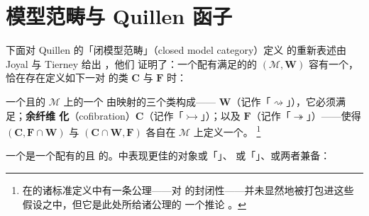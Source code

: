 
\providecommand{\rvC}{\mathbf{C}}  %
\providecommand{\rvW}{\mathbf{W}}  %
\providecommand{\rvF}{\mathbf{F}}  %
\providecommand{\rvWarrow}{\rightsquigarrow}%
\providecommand{\rvFarrow}{\twoheadrightarrow}%
\providecommand{\rvTFarrow}{\rightsquigarrow\joinrel\twoheadrightarrow}%
\providecommand{\rvCarrow}{\rightarrowtail}%
\providecommand{\rvTCarrow}{\rightarrowtail\joinrel\rightsquigarrow}%

\section{模型范畴与 Quillen 函子}\label{sec:model-categories-and-quillen-functors}

下面对 Quillen 的「闭模型范畴」（closed model category）定义%
\cite[I.5.1.1]{bib93} 的重新表述由 Joyal 与 Tierney 给出 \cite[7.7]{bib64}，他们%
证明了：一个配有满足\trTwoOfThreeProperty{}的\trWeakEquivalence{}的\trCategory{}
$(\mathcal{M},\rvW)$ 容有一个\trModelStructure，恰在存在定义如下一对%
\trWeakFactorizationSystem{}的类 $\rvC$ 与 $\rvF$ 时：

\begin{definition}[模型范畴]\label{def:model-structure}
一个\trComplete{}且\trCocomplete{}的\trCategory{} $\mathcal{M}$ 上的一个%
\textbf{\trModelStructure}由映射的三个类构成——\textbf{\trWeakEquivalence}
$\rvW$（记作「$\rvWarrow$」），它必须满足\trTwoOfThreeProperty；\textbf{余纤维
化}（cofibration）$\rvC$（记作「$\rvCarrow$」）；以及\textbf{\trFibration}
$\rvF$（记作「$\rvFarrow$」）——使得 $(\rvC,\rvF\cap\rvW)$ 与
$(\rvC\cap\rvW,\rvF)$ 各自在 $\mathcal{M}$ 上定义一个\trWeakFactorizationSystem。%
\footnote{在\trModelCategory{}的诸标准定义中有一条公理——\trWeakEquivalence{}对%
\trRetract{}的封闭性——并未显然地被打包进这些假设之中，但它是此处所给诸公理的
一个推论 \cite[7.8]{bib64}。}

一个\textbf{\trModelCategory}是一个配有\trModelStructure{}的\trComplete{}且%
\trCocomplete{}的\trCategory。\trModelCategory{}中表现更佳的对象或「\trFibrant」、
或「\trCofibrant」、或两者兼备：
\end{definition}

